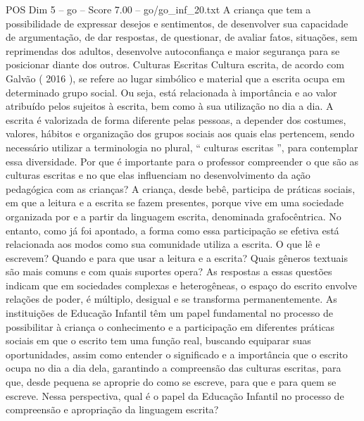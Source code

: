 \begin{textsample}{POS Dim 5 – go – Score 7.00 – go/go\_inf\_20.txt}
A criança que tem a possibilidade de expressar desejos e sentimentos, de desenvolver sua capacidade de argumentação, de dar respostas, de questionar, de avaliar fatos, situações, sem reprimendas dos adultos, desenvolve autoconfiança e maior segurança para se posicionar diante dos outros.
Culturas Escritas Cultura escrita, de acordo com Galvão ( 2016 ), se refere ao lugar simbólico e material que a escrita ocupa em determinado grupo social.
Ou seja, está relacionada à importância e ao valor atribuído pelos sujeitos à escrita, bem como à sua utilização no dia a dia.
A escrita é valorizada de forma diferente pelas pessoas, a depender dos costumes, valores, hábitos e organização dos grupos sociais aos quais elas pertencem, sendo necessário utilizar a terminologia no plural, “ culturas escritas ”, para contemplar essa diversidade.
Por que é importante para o professor compreender o que são as culturas escritas e no que elas influenciam no desenvolvimento da ação pedagógica com as crianças?
A criança, desde bebê, participa de práticas sociais, em que a leitura e a escrita se fazem presentes, porque vive em uma sociedade organizada por e a partir da linguagem escrita, denominada grafocêntrica.
No entanto, como já foi apontado, a forma como essa participação se efetiva está relacionada aos modos como sua comunidade utiliza a escrita.
O que lê e escrevem?
Quando e para que usar a leitura e a escrita?
Quais gêneros textuais são mais comuns e com quais suportes opera?
As respostas a essas questões indicam que em sociedades complexas e heterogêneas, o espaço do escrito envolve relações de poder, é múltiplo, desigual e se transforma permanentemente.
As instituições de Educação Infantil têm um papel fundamental no processo de possibilitar à criança o conhecimento e a participação em diferentes práticas sociais em que o escrito tem uma função real, buscando equiparar suas oportunidades, assim como entender o significado e a importância que o escrito ocupa no dia a dia dela, garantindo a compreensão das culturas escritas, para que, desde pequena se aproprie do como se escreve, para que e para quem se escreve.
Nessa perspectiva, qual é o papel da Educação Infantil no processo de compreensão e apropriação da linguagem escrita?

\end{textsample}
